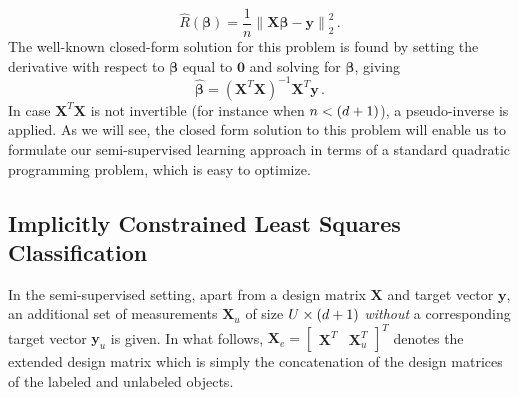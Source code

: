 \documentclass{elsarticle}
\begin{document}
\begin{equation} \label{squaredloss}
\hat{R}(\boldsymbol{\beta}) = \frac{1}{n} \left\|  \mathbf{X} \boldsymbol{\beta}-\mathbf{y} \right\| _2^2 \, .
\end{equation}
The well-known closed-form solution for this problem is found by setting the derivative with respect to $\boldsymbol{\beta}$ equal to $\textbf{0}$ and solving for $\boldsymbol{\beta}$, giving
\begin{equation} \label{olssolution}
\boldsymbol{\hat{\beta}}=\left(\mathbf{X}^T \mathbf{X}\right)^{-1} \mathbf{X}^T \mathbf{y} \, .
\end{equation}
In case $\textbf{X}^T \textbf{X}$ is not invertible (for instance when $n<(d+1)$), a pseudo-inverse is applied. As we will see, the closed form solution to this problem will enable us to formulate our semi-supervised learning approach in terms of a standard quadratic programming problem, which is easy to optimize.

\subsection{Implicitly Constrained Least Squares Classification} \label{section:icls}

In the semi-supervised setting, apart from a design matrix $\textbf{X}$ and target vector $\textbf{y}$, an additional set of measurements $\textbf{X}_u$ of size $U \times (d+1)$ \emph{without} a corresponding target vector $\textbf{y}_u$ is given. In what follows, $\mathbf{X}_e=\begin{bmatrix} \mathbf{X}^T  & \mathbf{X}_u^T \end{bmatrix}^T$ denotes the extended design matrix which is simply the concatenation of the design matrices of the labeled and unlabeled objects.
\end{document}
